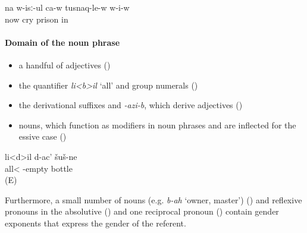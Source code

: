 \begin{exe}
	\ex	\label{ex:‎Now he is crying in prisonAGREE}
	\gll	na	w-isː-ul	ca-w	tusnaq-le-w	w-i-w\\
		now	cry		prison	in\\
	\glt	{}
\end{exe}


\paragraph*{Domain of the noun phrase}

\begin{itemize}
	\item	a handful of adjectives ()
	\item	the quantifier \textit{li<b>il} ‘all' and group numerals ()
	\item	the derivational suffixes  and \textit{-azi-b}, which derive adjectives ()
	\item	nouns, which function as modifiers in noun phrases and are inflected for the essive case ()
\end{itemize}


\begin{exe}
	\ex	\label{ex:All empty bottlesAGREE}
	\gll	li<d>il d-ac' šuš-ne\\
		all<\tsc{npl} 	-empty	bottle\\
	\glt	{} (E)
\end{exe}



Furthermore, a small number of nouns (e.g. \textit{b-ah} ‘owner, master') () and reflexive pronouns in the absolutive () and one reciprocal pronoun () contain gender exponents that express the gender of the referent.

